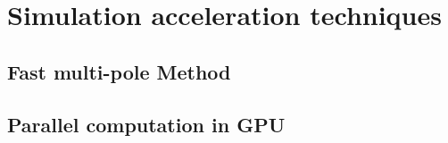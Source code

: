 \section{Simulation acceleration techniques}

\subsection{Fast multi-pole Method}

\subsection{Parallel computation in GPU}

%



